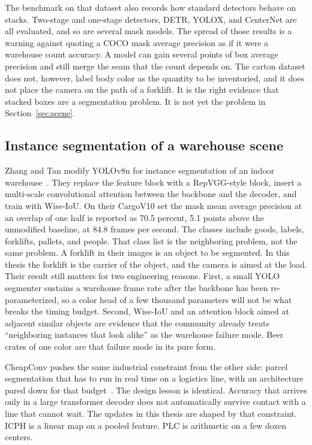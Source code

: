 The benchmark on that dataset also records how standard detectors behave on stacks. Two-stage and one-stage detectors, DETR, YOLOX, and CenterNet are all evaluated, and so are several mask models. The spread of those results is a warning against quoting a COCO mask average precision as if it were a warehouse count accuracy. A model can gain several points of box average precision and still merge the seam that the count depends on. The carton dataset does not, however, label body color as the quantity to be inventoried, and it does not place the camera on the path of a forklift. It is the right evidence that stacked boxes are a segmentation problem. It is not yet the problem in Section~\ref{sec:scene}.

\subsection{Instance segmentation of a warehouse scene}
\label{sec:warehouse-yolo}

Zhang and Tan modify YOLOv8n for instance segmentation of an indoor warehouse~\cite{zhang2025warehouse}. They replace the feature block with a RepVGG-style block, insert a multi-scale convolutional attention between the backbone and the decoder, and train with Wise-IoU. On their CargoV10 set the mask mean average precision at an overlap of one half is reported as 70.5 percent, 5.1 points above the unmodified baseline, at 84.8 frames per second. The classes include goods, labels, forklifts, pallets, and people. That class list is the neighboring problem, not the same problem. A forklift in their images is an object to be segmented. In this thesis the forklift is the carrier of the object, and the camera is aimed at the load. Their result still matters for two engineering reasons. First, a small YOLO segmenter sustains a warehouse frame rate after the backbone has been re-parameterized, so a color head of a few thousand parameters will not be what breaks the timing budget. Second, Wise-IoU and an attention block aimed at adjacent similar objects are evidence that the community already treats ``neighboring instances that look alike'' as the warehouse failure mode. Beer crates of one color are that failure mode in its pure form.

CheapConv pushes the same industrial constraint from the other side: parcel segmentation that has to run in real time on a logistics line, with an architecture pared down for that budget~\cite{zou2025cheapconv}. The design lesson is identical. Accuracy that arrives only in a large transformer decoder does not automatically survive contact with a line that cannot wait. The updates in this thesis are shaped by that constraint. ICPH is a linear map on a pooled feature. PLC is arithmetic on a few dozen centers.

